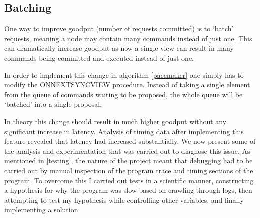 
\subsection{Batching} \label{batching}
One way to improve goodput (number of requests committed) is to `batch' requests, meaning a node may contain many commands instead of just one. This can dramatically increase goodput as now a single view can result in many commands being committed and executed instead of just one.

In order to implement this change in algorithm \ref{pacemaker} one simply has to modify the ON{\large N}EXT{\large S}YNC{\large V}IEW procedure. Instead of taking a single element from the queue of commands waiting to be proposed, the whole queue will be `batched' into a single proposal.

In theory this change should result in much higher goodput without any significant increase in latency. Analysis of timing data after implementing this feature revealed that latency had increased substantially. We now present some of the analysis and experimentation that was carried out to diagnose this issue. As mentioned in \ref{testing}, the nature of the project meant that debugging had to be carried out by manual inspection of the program trace and timing sections of the program. To overcome this I carried out tests in a scientific manner, constructing a hypothesis for why the program was slow based on crawling through logs, then attempting to test my hypothesis while controlling other variables, and finally implementing a solution.

